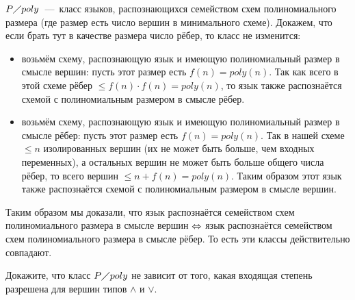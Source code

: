 \documentclass[a4paper,12pt]{article}
\begin{document}
\begin{solution}
	$P \diagup poly$~---~класс языков, распознающихся семейством схем полиномиального размера (где размер есть число вершин в минимального схеме). Докажем, что если брать тут в качестве размера число рёбер, то класс не изменится:
	
	\begin{itemize}
		\item возьмём схему, распознающую язык и имеющую полиномиальный размер в смысле вершин: пусть этот размер есть $f(n) = poly(n)$. Так как всего в этой схеме рёбер $\le f(n) \cdot f(n) = poly(n)$, то язык также распознаётся схемой с полиномиальным размером в смысле рёбер.
		
		\item возьмём схему, распознающую язык и имеющую полиномиальный размер в смысле рёбер: пусть этот размер есть $f(n) = poly(n)$. Так в нашей схеме $\le n$ изолированных вершин (их не может быть больше, чем входных переменных), а остальных вершин не может быть больше общего числа рёбер, то всего вершин $\le n + f(n) = poly(n)$. Таким образом этот язык также распознаётся схемой с полиномиальным размером в смысле вершин.
	\end{itemize}

	Таким образом мы доказали, что язык распознаётся семейством схем полиномиального размера в смысле вершин $\Leftrightarrow$ язык распознаётся семейством схем полиномиального размера в смысле рёбер. То есть эти классы действительно совпадают.
\end{solution}

\newpage

\begin{tasknum}{5}
	Докажите, что класс $P \diagup poly$ не зависит от того, какая входящая степень разрешена
	для вершин типов $\wedge$ и $\vee$.
\end{tasknum}
\end{document}
